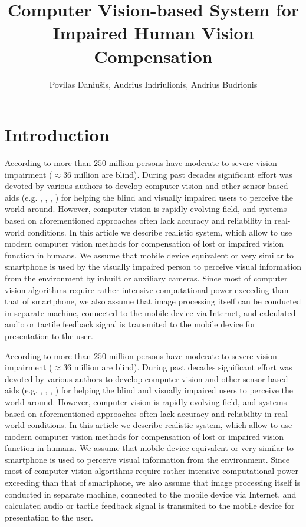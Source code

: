 \documentclass[a4paper,11pt]{article}
\author{Povilas Daniu\v{s}is, Audrius Indriulionis, Andrius Budrionis}
\title{Computer Vision-based System for Impaired Human Vision Compensation}
\begin{document}


\maketitle


\section{Introduction}

According to \cite{Bourne} more than $250$ million persons have moderate to severe vision impairment ($\approx 36$ million are blind). During past decades significant effort was devoted by various authors to develop computer vision and other sensor based aids (e.g. \cite{Caraiman}, \cite{Csapo}, \cite{Poggi}, \cite{Zientara}) for helping the blind and visually impaired users to perceive the world around. However, computer vision is rapidly evolving field, and systems based on aforementioned approaches often lack accuracy and reliability in real-world conditions. In this article we describe realistic system, which allow to use modern computer vision methods for compensation of lost or impaired vision function in humans. We assume that mobile device equivalent or very similar to smartphone is used by the visually impaired person to perceive visual information from the environment by inbuilt or auxiliary cameras. Since most of computer vision algorithms require rather intensive computational power exceeding than that of smartphone, we also assume that image processing itself can be conducted in separate machine, connected to the mobile device via Internet, and calculated audio or tactile feedback signal is transmited to the mobile device for presentation to the user. %

According to \cite{Bourne} more than $250$ million persons have moderate to severe vision impairment ($\approx 36$ million are blind). During past decades significant effort was devoted by various authors to develop computer vision and other sensor based aids (e.g. \cite{Caraiman}, \cite{Csapo}, \cite{Poggi}, \cite{Zientara}) for helping the blind and visually impaired users to perceive the world around. However, computer vision is rapidly evolving field, and systems based on aforementioned approaches often lack accuracy and reliability in real-world conditions. In this article we describe realistic system, which allow to use modern computer vision methods for compensation of lost or impaired vision function in humans. We assume that mobile device equivalent or very similar to smartphone is used to perceive visual information from the environment. Since most of computer vision algorithms require rather intensive computational power exceeding than that of smartphone, we also assume that image processing itself is conducted in separate machine, connected to the mobile device via Internet, and calculated audio or tactile feedback signal is transmited to the mobile device for presentation to the user.
\end{document}
